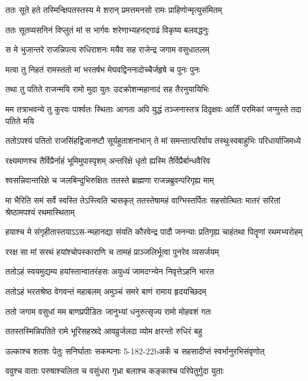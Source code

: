 \twolineshloka
{ततः सूते हते तस्मिन्क्षिपतस्तस्य मे शरान्}
{प्रमत्तमनसो रामः प्राहिणोन्मृत्युसंमितम्}


\twolineshloka
{ततः सूतव्यसनिनं विप्लुतं मां स भार्गवः}
{शरेणाभ्यहनद्गाढं विकृष्य बलवद्धनुः}


\twolineshloka
{स मे भुजान्तरे राजन्निपत्य रुधिराशनः}
{मयैव सह राजेन्द्र जगाम वसुधातलम्}


\twolineshloka
{मत्वा तु निहतं रामस्ततो मां भरतर्षभ}
{मेघवद्विननादोच्चैर्जहृषे च पुनः पुनः}


\twolineshloka
{तथा तु पतिते राजन्मयि रामो मुदा युतः}
{उदक्रोशन्महानादं सह तैरनुयायिभिः}


\threelineshloka
{मम तत्राभवन्ये तु कुरवः पार्श्वतः स्थिताः}
{आगता अपि युद्धं तञ्जनास्तत्र दिदृक्षवः}
{आर्तिं परमिकां जग्मुस्ते तदा पतिते मयि}


\twolineshloka
{ततोऽपश्यं पतितो राजसिंहद्विजानष्टौ सूर्यहुताशनाभान्}
{ते मां समन्तात्परिर्वाय तस्थुःस्वबाहुभिः परिधार्याजिमध्ये}


\twolineshloka
{रक्ष्यमाणश्च तैर्विप्रैर्नाहं भूमिमुपास्पृशम्}
{अन्तरिक्षे धृतो ह्यस्मि तैर्विप्रैर्बान्धवैरिव}


\twolineshloka
{श्वसन्निवान्तरिक्षे च जलबिन्दुभिरुक्षितः}
{ततस्ते ब्राह्मणा राजन्नब्रुवन्परिगृह्य माम्}


\threelineshloka
{मा भैरिति समं सर्वे स्वस्ति तेऽस्त्विति चासकृत्}
{ततस्तेषामहं वाग्भिस्तर्पितः सहसोत्थितः}
{मातरं सरितां श्रेष्ठामपश्यं रथमास्थिताम्}


\twolineshloka
{हयाश्च मे संगृहीतास्तयाऽऽस-न्महानद्या संयति कौरवेन्द्र}
{पादौ जनन्याः प्रतिगृह्य चाहंतथा पितॄणां रथमभ्यरोहम्}


\twolineshloka
{ररक्ष सा मां सरथं हयांश्चोपस्काराणि च}
{तामहं प्राञ्जलिर्भूत्वा पुनरेव व्यसर्जयम्}


\twolineshloka
{ततोऽहं स्वयमुद्यम्य हयांस्तान्वातरंहसः}
{अयुध्यं जामदग्न्येन निवृत्तेऽहनि भारत}


\twolineshloka
{ततोऽहं भरतश्रेष्ठ वेगवन्तं महाबलम्}
{अमुञ्चं समरे बाणं रामाय हृदयच्छिदम्}


\twolineshloka
{ततो जगाम वसुधां मम बाणप्रपीडितः}
{जानुभ्यां धनुरुत्सृज्य रामो मोहवशं गतः}


\twolineshloka
{ततस्तस्मिन्निपतिते रामे भूरिसहस्रदे}
{आवव्रुर्जलदा व्योम क्षरन्तो रुधिरं बहु}


\twolineshloka
{उल्काश्च शतशः पेतुः सनिर्घाताः सकम्पनाः}
{5-182-22bअर्कं च सहसादीप्तं स्वर्भानुरभिसंवृणोत्}


\twolineshloka
{ववुश्च वाताः परुषाश्चलिता च वसुंधरा}
{गृध्रा बलाश्च कङ्काश्च परिपेतुर्गुदा युताः}


